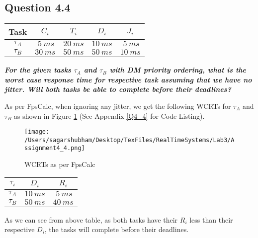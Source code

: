 \documentclass[oneside,a4paper]{article}
\begin{document}
\subsection*{\normalsize{Question 4.4}}
\begin{center}
\begin{tabular}{| c | c c c c |}
\hline
Task & $C_i$ & $T_i$ & $D_i$ & $J_i$ \\
\hline
$\tau_A$ & $\ 5\ ms$ & $20\ ms$ & $10\ ms$ & $\ 5\ ms$ \\
$\tau_B$ & $30\ ms$ & $50\ ms$ & $50\ ms$ & $10\ ms$ \\
\hline
\end{tabular}
\end{center}
\textit{\textbf{For the given tasks $\tau_A$ and $\tau_B$ with DM priority ordering, what is the worst case response time for respective task assuming that we have no jitter. Will both tasks be able to complete before their deadlines?}}\par
As per FpsCalc, when ignoring any jitter, we get the following WCRTs for $\tau_A$ and $\tau_B$ as shown in Figure \ref{fig4_4} (See Appendix \ref{Q4_4} for Code Listing).
\begin{center}
\begin{figure}[H]
                    \centering
                    \texttt{[image: /Users/sagarshubham/Desktop/TexFiles/RealTimeSystems/Lab3/Assignment4\_4.png]}
                    \caption[Figure for Question 4.4]{WCRTs as per FpsCalc}
                    \label{fig4_4}        
\end{figure}
\begin{tabular}{| c | c | c |}
\hline
\textbf{$\tau_i$} & \textbf{$D_i$} & \textbf{$R_i$} \\
\hline
$\tau_A$ & $10\ ms$ & $\ 5\ ms$ \\
$\tau_B$ & $50 \ ms$ & $40\ ms$ \\
\hline
\end{tabular}
\end{center}\par
As we can see from above table, as both tasks have their $R_i$ less than their respective $D_i$, the tasks will complete before their deadlines.\par
\pagebreak
\end{document}
